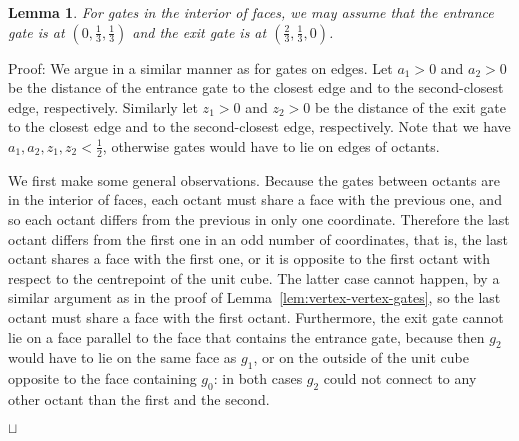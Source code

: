 \documentclass[11pt,a4paper]{article}
\newtheorem{lemma}{Lemma}
\newenvironment{proof}{Proof:}{\qed}
\def\squareforqed{\hbox{\rlap{$\sqcap$}$\sqcup$}}
\def\qed{\ifmmode\squareforqed\else{\unskip\nobreak\hfil
\penalty50\hskip1em\null\nobreak\hfil\squareforqed
\parfillskip=0pt\finalhyphendemerits=0\endgraf}\fi}
\begin{document}
\begin{lemma}\label{lem:face-face-gates}
For gates in the interior of faces, we may assume that the entrance gate is at $(0,\frac13,\frac13)$ and the exit gate is at $(\frac23,\frac13,0)$.
\end{lemma}
\begin{proof}
We argue in a similar manner as for gates on edges. Let $a_1 > 0$ and $a_2 > 0$ be the distance of the entrance gate to the closest edge and to the second-closest edge, respectively. Similarly let $z_1 > 0$ and $z_2 > 0$ be the distance of the exit gate to the closest edge and to the second-closest edge, respectively. Note that we have $a_1, a_2, z_1, z_2 < \frac12$, otherwise gates would have to lie on edges of octants.

We first make some general observations. Because the gates between octants are in the interior of faces, each octant must share a face with the previous one, and so each octant differs from the previous in only one coordinate. Therefore the last octant differs from the first one in an odd number of coordinates, that is, the last octant shares a face with the first one, or it is opposite to the first octant with respect to the centrepoint of the unit cube. The latter case cannot happen, by a similar argument as in the proof of Lemma~\ref{lem:vertex-vertex-gates}, so the last octant must share a face with the first octant. Furthermore, the exit gate cannot lie on a face parallel to the face that contains the entrance gate, because then $g_2$ would have to lie on the same face as $g_1$, or on the outside of the unit cube opposite to the face containing $g_0$: in both cases $g_2$ could not connect to any other octant than the first and the second.


\end{proof}
\end{document}
